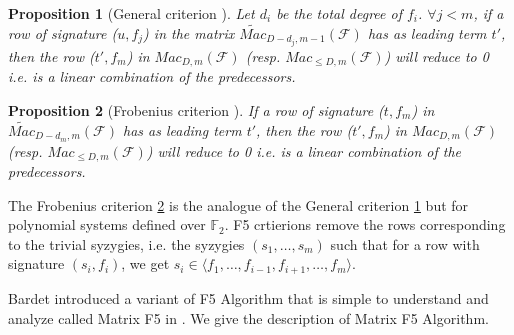 \documentclass[english]{article}
\newtheorem{proposition}{Proposition}[section]
\newcommand{\Mac}[3]{{Mac_{#1, #2}(\mathcal{#3})}}
\newcommand{\Mact}[3]{{\widetilde{Mac}_{#1, #2}(\mathcal{#3})}}
\begin{document}
		\begin{proposition}[General criterion \cite{F02}]
			\label{F5Crit}
			Let $d_i$ be the total degree of $f_i$.
			$\forall j < m$, if a row of signature ($u, f_j$) in the matrix $\Mact{D-d_j}{m-1}{F}$ has as leading term $t'$, then the row ($t', f_m$) in $\Mac{D}{m}{F}$ (resp. $\Mac{\leq D}{m}{F}$) will reduce to 0 i.e. is a linear combination of the predecessors.
		\end{proposition}
		
		\begin{proposition}[Frobenius criterion \cite{F02}]
			\label{Frob}
			If a row of signature ($t, f_m$) in $\Mact{D - d_m}{m}{F}$ has as leading term $t'$, then the row ($t', f_m$) in $\Mac{D}{m}{F}$ (resp. $\Mac{\leq D}{m}{F}$) will reduce to 0 i.e. is a linear combination of the predecessors.
		\end{proposition}
		
		The Frobenius criterion \ref{Frob} is the analogue of the General criterion \ref{F5Crit} but for polynomial systems defined over $\mathbb{F}_2$.
		F5 crtierions remove the rows corresponding to the trivial syzygies, i.e. the syzygies $(s_1, \dots, s_m)$ such that for a row with signature $(s_i, f_i)$, we get $s_i \in \langle f_1,\dots,f_{i-1},f_{i+1},\dots,f_m \rangle$.
		
		Bardet introduced a variant of F5 Algorithm that is simple to understand and analyze called Matrix F5 in \cite{Bardet04}.
		We give the description of Matrix F5 Algorithm.
		
\end{document}
